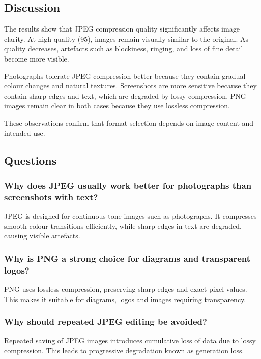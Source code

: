 \documentclass[12pt,a4paper]{article}
\begin{document}
\subsection{Discussion}

The results show that JPEG compression quality significantly affects image clarity. At high quality (95), images remain visually similar to the original. As quality decreases, artefacts such as blockiness, ringing, and loss of fine detail become more visible.

Photographs tolerate JPEG compression better because they contain gradual colour changes and natural textures. Screenshots are more sensitive because they contain sharp edges and text, which are degraded by lossy compression. PNG images remain clear in both cases because they use lossless compression.

These observations confirm that format selection depends on image content and intended use.

\subsection{Questions}

\subsubsection{Why does JPEG usually work better for photographs than screenshots with text?}

JPEG is designed for continuous-tone images such as photographs. It compresses smooth colour transitions efficiently, while sharp edges in text are degraded, causing visible artefacts.

\subsubsection{Why is PNG a strong choice for diagrams and transparent logos?}

PNG uses lossless compression, preserving sharp edges and exact pixel values. This makes it suitable for diagrams, logos and images requiring transparency.

\subsubsection{Why should repeated JPEG editing be avoided?}

Repeated saving of JPEG images introduces cumulative loss of data due to lossy compression. This leads to progressive degradation known as generation loss.
\end{document}
